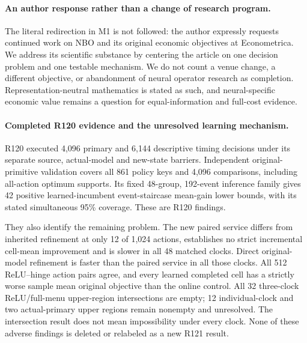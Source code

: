 \paragraph{An author response rather than a change of research program.}
The literal redirection in M1 is not followed: the author expressly requests
continued work on NBO and its original economic objectives at Econometrica.
We address its scientific substance by centering the article on one
decision problem and one testable mechanism. We do not count a venue change,
a different objective, or abandonment of neural operator research as
completion. Representation-neutral mathematics is stated as such, and
neural-specific economic value remains a question for equal-information
and full-cost evidence.

\paragraph{Completed R120 evidence and the unresolved learning mechanism.}
R120 executed 4,096 primary and 6,144 descriptive timing decisions under
its separate source, actual-model and new-state barriers. Independent
original-primitive validation covers all 861 policy keys and 4,096
comparisons, including all-action optimum supports. Its fixed 48-group,
192-event inference family gives 42 positive learned-incumbent
event-staircase mean-gain lower bounds, with its stated simultaneous
95\% coverage. These are R120 findings.

They also identify the remaining problem. The new paired service differs
from inherited refinement at only 12 of 1,024 actions, establishes no
strict incremental cell-mean improvement and is slower in all 48 matched
clocks. Direct original-model refinement is faster than the paired service
in all those clocks. All 512 ReLU--hinge action pairs agree, and every
learned completed cell has a strictly worse sample mean original objective
than the online control. All 32 three-clock ReLU/full-menu upper-region
intersections are empty; 12 individual-clock and two actual-primary upper
regions remain nonempty and unresolved. The intersection result does not
mean impossibility under every clock. None of these adverse findings is
deleted or relabeled as a new R121 result.

